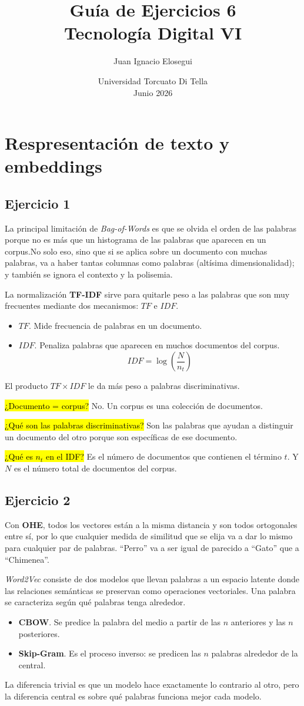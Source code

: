 \documentclass[a4paper,11pt]{article}
\title{\vspace{-2cm}\textbf{Guía de Ejercicios 6}\\[0.2cm]
\large Tecnología Digital VI}
\author{Juan Ignacio Elosegui}
\date{Universidad Torcuato Di Tella \\ Junio 2026}
\begin{document}
\maketitle
\section*{Respresentación de texto y embeddings}
\subsection*{Ejercicio 1}
La principal limitación de \textit{Bag-of-Words} es que se olvida el orden de las palabras porque no es más que un histograma de las palabras que aparecen en un corpus.No solo eso, sino que si se aplica sobre un documento con muchas palabras, va a haber tantas columnas como palabras (altísima dimensionalidad); y también se ignora el contexto y la polisemia.

La normalización \textbf{TF-IDF} sirve para quitarle peso a las palabras que son muy frecuentes mediante dos mecanismos: $TF$ e $IDF$.
\begin{itemize}
	\item $TF$. Mide frecuencia de palabras en un documento.
	\item $IDF$. Penaliza palabras que aparecen en muchos documentos del corpus. $$IDF = \log\left(\frac{N}{n_{t}}\right)$$
\end{itemize}
El producto $TF \times IDF$ le da más peso a palabras discriminativas.

\hl{¿Documento = corpus?} No. Un corpus es una colección de documentos.

\hl{¿Qué son las palabras discriminativas?} Son las palabras que ayudan a distinguir un documento del otro porque son específicas de ese documento.

\hl{¿Qué es $n_{t}$ en el IDF?} Es el número de documentos que contienen el término $t$. Y $N$ es el número total de documentos del corpus.
\subsection*{Ejercicio 2}
Con \textbf{OHE}, todos los vectores están a la misma distancia y son todos ortogonales entre sí, por lo que cualquier medida de similitud que se elija va a dar lo mismo para cualquier par de palabras. ``Perro'' va a ser igual de parecido a ``Gato'' que a ``Chimenea''.

\textit{Word2Vec} consiste de dos modelos que llevan palabras a un espacio latente donde las relaciones semánticas se preservan como operaciones vectoriales. Una palabra se caracteriza según qué palabras tenga alrededor.
\begin{itemize}
	\item \textbf{CBOW}. Se predice la palabra del medio a partir de las $n$ anteriores y las $n$ posteriores.
	\item \textbf{Skip-Gram}. Es el proceso inverso: se predicen las $n$ palabras alrededor de la central.
\end{itemize}
La diferencia trivial es que un modelo hace exactamente lo contrario al otro, pero la diferencia central es sobre qué palabras funciona mejor cada modelo.
\end{document}

